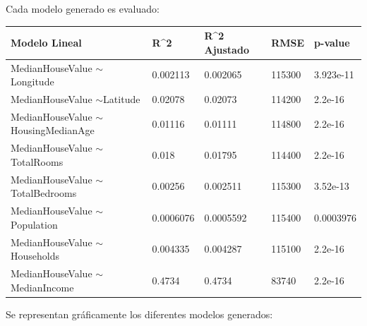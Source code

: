Cada modelo generado es evaluado:
\begin{table}[!h]
	\begin{tabular}{l|llll}
		Modelo Lineal                           & R\textasciicircum{}2 & R\textasciicircum{}2 Ajustado & RMSE   & p-value   \\ \hline
		MedianHouseValue $\sim$Longitude        & 0.002113             & 0.002065                      & 115300 & 3.923e-11 \\
		MedianHouseValue $\sim$Latitude         & 0.02078              & 0.02073                       & 114200 & 2.2e-16   \\
		MedianHouseValue $\sim$HousingMedianAge & 0.01116              & 0.01111                       & 114800 & 2.2e-16   \\
		MedianHouseValue $\sim$TotalRooms       & 0.018                & 0.01795                       & 114400 & 2.2e-16   \\
		MedianHouseValue $\sim$TotalBedrooms    & 0.00256              & 0.002511                      & 115300 & 3.52e-13  \\
		MedianHouseValue $\sim$Population       & 0.0006076            & 0.0005592                     & 115400 & 0.0003976 \\
		MedianHouseValue $\sim$Households       & 0.004335             & 0.004287                      & 115100 & 2.2e-16   \\
		MedianHouseValue $\sim$MedianIncome     & 0.4734               & 0.4734                        & 83740  & 2.2e-16  
	\end{tabular}
\end{table}

\newpage
Se representan gráficamente los diferentes modelos generados:

